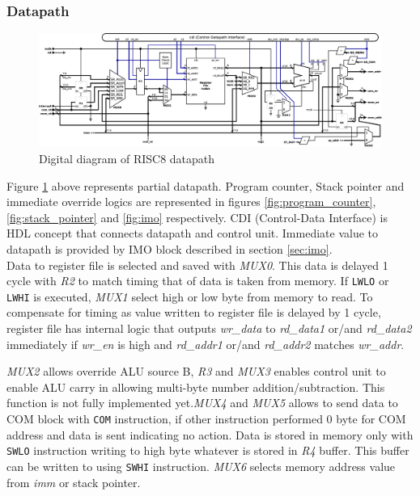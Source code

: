 \documentclass[a4paper,12pt]{article}
\begin{document}
\begin{landscape}
\subsubsection{Datapath} \label{sec:datapath}
\begin{figure}[h!]
	\centering
	\includegraphics[width=\linewidth]{graphics/datapath.eps}
	\caption{Digital diagram of RISC8 datapath}
	\label{fig:datapath}	
\end{figure}

Figure \ref{fig:datapath} above represents partial datapath. Program counter, Stack pointer and immediate override logics are represented in figures \ref{fig:program_counter}, \ref{fig:stack_pointer} and \ref{fig:imo} respectively. CDI (Control-Data Interface) is HDL concept that connects datapath and control unit. Immediate value to datapath is provided by IMO block described in section \ref{sec:imo}.\\
Data to register file is selected and saved with \textit{MUX0}. This data is delayed 1 cycle with \textit{R2} to match timing that of data is taken from memory. If \texttt{LWLO} or \texttt{LWHI} is executed, \textit{MUX1} select high or low byte from memory to read. To compensate for timing as value written to register file is delayed by 1 cycle, register file has internal logic that outputs \textit{wr\_data} to \textit{rd\_data1} or/and  \textit{rd\_data2} immediately if \textit{wr\_en} is high and \textit{rd\_addr1} or/and \textit{rd\_addr2} matches \textit{wr\_addr}.\\
\end{landscape}
\textit{MUX2} allows override ALU source B, \textit{R3} and \textit{MUX3} enables control unit to enable ALU carry in allowing multi-byte number addition/subtraction. This function is not fully implemented yet.\textit{MUX4} and \textit{MUX5} allows to send data to COM block with \texttt{COM} instruction, if other instruction performed 0 byte for COM address and data is sent indicating no action. Data is stored in memory only with \texttt{SWLO} instruction writing to high byte whatever is stored in \textit{R4} buffer. This buffer can be written to using \texttt{SWHI} instruction. \textit{MUX6} selects memory address value from \textit{imm} or stack pointer.
\end{document}
